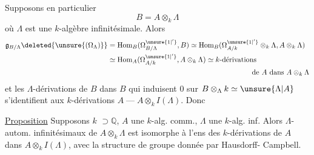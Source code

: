 

Supposons en particulier
\[
B=A\otimes_k\Lambda
\]
où $\Lambda$ est une $k$-algèbre infinitésimale.
Alors 
\[
\begin{aligned}
\mathfrak g_{B/\Lambda}\deleted{\unsure{(\Omega_\Lambda)}}
&=\operatorname{Hom}_B(\Omega^{\unsure{1|'}}_{B/\Lambda},B)
\simeq\operatorname{Hom}_B(\Omega^{\unsure{1|'}}_{A/k}\otimes_k\Lambda,A\otimes_k\Lambda)\\
&\simeq\operatorname{Hom}_A(\Omega^{\unsure{1|'}}_{A/k},A\otimes_k\Lambda)
\simeq\text{$k$-dérivations}\\
&\hspace{7cm}\text{de $A$ dans $A\otimes_k\Lambda$}
\end{aligned}
\]
et les $\Lambda$-dérivations de $B$ dans $B$ qui
induisent $0$ sur $B\otimes_\Lambda k\simeq\unsure{\Lambda|A}$ s'identifient
aux $k$-dérivations $A\;\text{---}\;A\otimes_k I(\Lambda)$.
Donc

\uline{Proposition} Supposons $k$  $\supset\mathbb Q$, $A$ une
$k$-alg. comm., $\Lambda$ une $k$-alg. inf.
Alors   $\Lambda$-autom. infinitésimaux de
$A\otimes_k\Lambda$  est isomorphe
à l'ens des $k$-dérivations de
$A$ dans $A\otimes_k I(\Lambda)$, avec la structure
de groupe donnée par Hausdorff-
Campbell.

